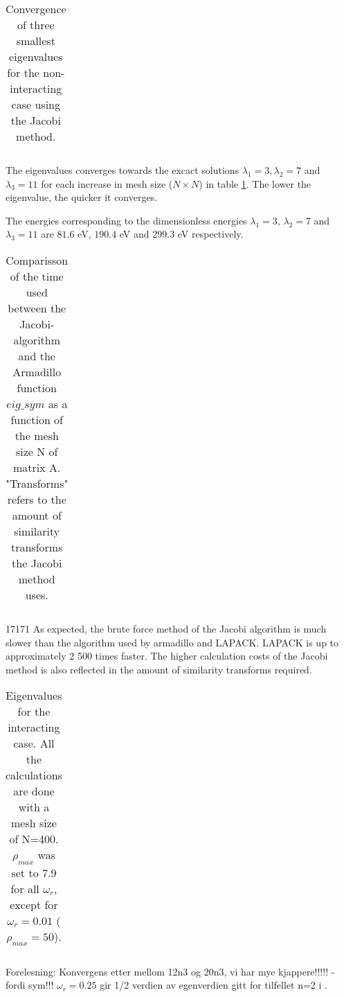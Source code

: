 
\begin{table}[H]\caption{Convergence of three smallest eigenvalues for the non-interacting case using the Jacobi method.}
	\label{tab:eigval}
	\begin{tabular}{cccc}
		
	\end{tabular}
\end{table}

The eigenvalues converges towards the excact solutions  $ \lambda_1=3, \lambda_2 =7  $ and $ \lambda_3 =11 $ for each increase in mesh size  ($ N\times N $) in table \ref{tab:eigval}. The lower the  eigenvalue, the quicker it converges. 

The energies corresponding to the dimensionless energies $\lambda_1 = 3 $, $\lambda_2 = 7 $ and $\lambda_3 = 11$ are $ 81.6 $ eV,  $ 190.4 $ eV and $ 299.3 $ eV respectively. 

\begin{table}[H]\caption{Comparisson of the time used between the Jacobi-algorithm and the Armadillo function  $eig\_sym$ as a function of the mesh size N of matrix A. "Transforms" refers to the amount of similarity transforms the Jacobi method uses.}
	\label{tab:time}
	\begin{tabular}{cccccc}
		
	\end{tabular}
\end{table}

17171
As expected, the brute force method of the Jacobi algorithm is much slower than the algorithm used by armadillo and LAPACK. LAPACK is up to approximately 2 500 times faster. The higher calculation costs of the Jacobi method is also reflected in the amount of similarity transforms required.  


\begin{table}[H]\caption{Eigenvalues for the interacting case. All the calculations are done with a mesh size of N=400. $ \rho_{max} $ was set to $ 7.9 $ for all $ \omega_r $, except for $ \omega_r  = 0.01$ ( $ \rho_{max} =50$). }
	\label{tab:omega}
	\begin{tabular}{cccc}
		
	\end{tabular}
\end{table}

Forelesning: Konvergens etter mellom 12n3 og 20n3, vi har mye kjappere!!!!! - fordi sym!!!
$ \omega_r= 0.25 $ gir 1/2 verdien av egenverdien gitt for tilfellet n=2 i \cite{litterature}. 